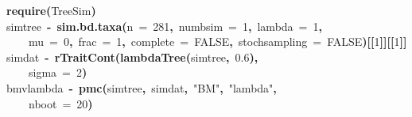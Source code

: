 \documentclass{elsarticle}
\makeatletter
\newcommand{\hlnumber}[1]{\textcolor[rgb]{0,0,0}{#1}}%
\newcommand{\hlfunctioncall}[1]{\textcolor[rgb]{.5,0,.33}{\textbf{#1}}}%
\newcommand{\hlstring}[1]{\textcolor[rgb]{.6,.6,1}{#1}}%
\newcommand{\hlkeyword}[1]{\textbf{#1}}%
\newcommand{\hlargument}[1]{\textcolor[rgb]{.69,.25,.02}{#1}}%
\newcommand{\hlassignement}[1]{\textbf{#1}}%
\newcommand{\hlsymbol}[1]{#1}%
\newcommand{\hlstd}[1]{\textcolor[rgb]{0,0,0}{#1}}%
\newenvironment{kframe}{%
 \def\FrameCommand##1{\hskip\@totalleftmargin \hskip-\fboxsep
 \colorbox{shadecolor}{##1}\hskip-\fboxsep
     \hskip-\linewidth \hskip-\@totalleftmargin \hskip\columnwidth}%
 \MakeFramed {\advance\hsize-\width
   \@totalleftmargin\z@ \linewidth\hsize
   \@setminipage}}%
 {\par\unskip\endMakeFramed}
\newenvironment{knitrout}{}{} %
\makeatother
\begin{document}




\begin{knitrout}
\color{fgcolor}\begin{kframe}
\begin{flushleft}
\ttfamily\noindent
\hlfunctioncall{require}\hlkeyword{(}\hlsymbol{TreeSim}\hlkeyword{)}\hspace*{\fill}\\
\hlstd{}\hlsymbol{simtree}{\ }\hlassignement{\usebox{\hlnormalsizeboxlessthan}-}{\ }\hlfunctioncall{sim.bd.taxa}\hlkeyword{(}\hlargument{n}{\ }\hlargument{=}{\ }\hlnumber{281}\hlkeyword{,}{\ }\hlargument{numbsim}{\ }\hlargument{=}{\ }\hlnumber{1}\hlkeyword{,}{\ }\hlargument{lambda}{\ }\hlargument{=}{\ }\hlnumber{1}\hlkeyword{,}\hspace*{\fill}\\
\hlstd{}{\ }{\ }{\ }{\ }\hlargument{mu}{\ }\hlargument{=}{\ }\hlnumber{0}\hlkeyword{,}{\ }\hlargument{frac}{\ }\hlargument{=}{\ }\hlnumber{1}\hlkeyword{,}{\ }\hlargument{complete}{\ }\hlargument{=}{\ }\hlnumber{FALSE}\hlkeyword{,}{\ }\hlargument{stochsampling}{\ }\hlargument{=}{\ }\hlnumber{FALSE}\hlkeyword{)}\hlkeyword{[[}\hlnumber{1}\hlkeyword{]}\hlkeyword{]}\hlkeyword{[[}\hlnumber{1}\hlkeyword{]}\hlkeyword{]}\hspace*{\fill}\\
\hlstd{}\hlsymbol{simdat}{\ }\hlassignement{\usebox{\hlnormalsizeboxlessthan}-}{\ }\hlfunctioncall{rTraitCont}\hlkeyword{(}\hlfunctioncall{lambdaTree}\hlkeyword{(}\hlsymbol{simtree}\hlkeyword{,}{\ }\hlnumber{0.6}\hlkeyword{)}\hlkeyword{,}\hspace*{\fill}\\
\hlstd{}{\ }{\ }{\ }{\ }\hlargument{sigma}{\ }\hlargument{=}{\ }\hlnumber{2}\hlkeyword{)}\hspace*{\fill}\\
\hlstd{}\hlsymbol{bm\usebox{\hlnormalsizeboxunderscore}v\usebox{\hlnormalsizeboxunderscore}lambda}{\ }\hlassignement{\usebox{\hlnormalsizeboxlessthan}-}{\ }\hlfunctioncall{pmc}\hlkeyword{(}\hlsymbol{simtree}\hlkeyword{,}{\ }\hlsymbol{simdat}\hlkeyword{,}{\ }\hlstring{"{}BM"{}}\hlkeyword{,}{\ }\hlstring{"{}lambda"{}}\hlkeyword{,}\hspace*{\fill}\\
\hlstd{}{\ }{\ }{\ }{\ }\hlargument{nboot}{\ }\hlargument{=}{\ }\hlnumber{20}\hlkeyword{)}\mbox{}
\normalfont
\end{flushleft}
\end{kframe}
\end{knitrout}
\end{document}

